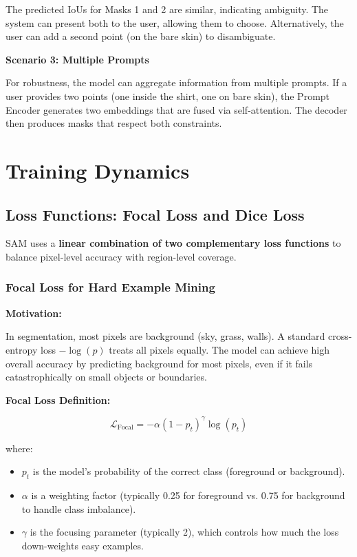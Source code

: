 The predicted IoUs for Masks 1 and 2 are similar, indicating ambiguity. The system can present both to the user, allowing them to choose. Alternatively, the user can add a second point (on the bare skin) to disambiguate.

\textbf{Scenario 3: Multiple Prompts}

For robustness, the model can aggregate information from multiple prompts. If a user provides two points (one inside the shirt, one on bare skin), the Prompt Encoder generates two embeddings that are fused via self-attention. The decoder then produces masks that respect both constraints.

\section{Training Dynamics}

\subsection{Loss Functions: Focal Loss and Dice Loss}

SAM uses a \textbf{linear combination of two complementary loss functions} to balance pixel-level accuracy with region-level coverage.

\subsubsection{Focal Loss for Hard Example Mining}

\textbf{Motivation:}

In segmentation, most pixels are background (sky, grass, walls). A standard cross-entropy loss $-\log(p)$ treats all pixels equally. The model can achieve high overall accuracy by predicting background for most pixels, even if it fails catastrophically on small objects or boundaries.

\textbf{Focal Loss Definition:}

\[ \mathcal{L}_{\text{Focal}} = -\alpha(1 - p_t)^\gamma \log(p_t) \]

where:
\begin{itemize}
    \item $p_t$ is the model's probability of the correct class (foreground or background).
    \item $\alpha$ is a weighting factor (typically 0.25 for foreground vs. 0.75 for background to handle class imbalance).
    \item $\gamma$ is the focusing parameter (typically 2), which controls how much the loss down-weights easy examples.
\end{itemize}

